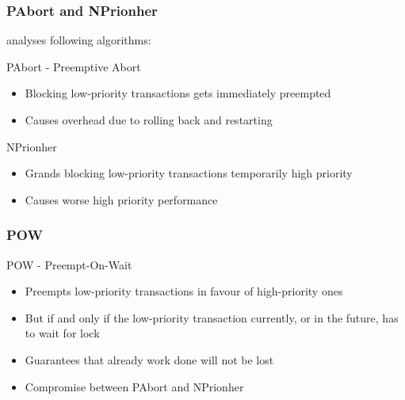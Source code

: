 \documentclass[9pt]{beamer}
\begin{document}
\begin{frame}
\frametitle<presentation>{PAbort and NPrionher}
   \cite{McWherter} analyses following algorithms:
   
   \begin{block}{PAbort - Preemptive Abort}
      \begin{itemize}
        \item Blocking low-priority transactions gets immediately preempted
        \item Causes overhead due to rolling back and restarting
      \end{itemize}
    \end{block}
  
  \begin{block}{NPrionher}
    \begin{itemize}
      \item Grands blocking low-priority transactions temporarily high priority
      \item Causes worse high priority performance 
    \end{itemize}
  \end{block}
\end{frame}

\begin{frame}
\frametitle<presentation>{POW}

  \begin{block}{POW - Preempt-On-Wait}
 
  \begin{itemize}
    \item Preempts low-priority transactions in favour of high-priority ones
    \item But if and only if the low-priority transaction currently, or in the future, has to wait for lock
    \item Guarantees that already work done will not be lost
    \item Compromise between PAbort and NPrionher
  \end{itemize}
  
  \end{block}
\end{frame}
\end{document}
